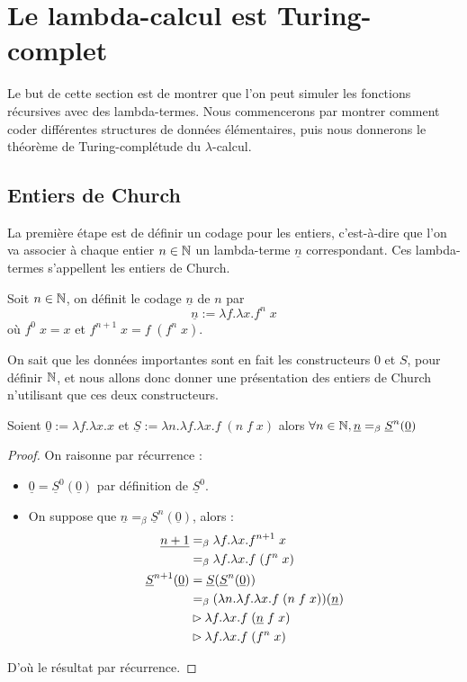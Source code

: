 \section{Le lambda-calcul est Turing-complet}

Le but de cette section est de montrer que l'on peut simuler les fonctions récursives avec des lambda-termes. Nous commencerons par montrer comment coder différentes structures de données élémentaires, puis nous donnerons le théorème de Turing-complétude du $\lambda$-calcul.

\subsection{Entiers de Church}

La première étape est de définir un codage pour les entiers, c'est-à-dire que l'on va associer à chaque entier $n\in\mathbb{N}$ un lambda-terme $\underline n$ correspondant. Ces lambda-termes s'appellent les entiers de Church.

\begin{defi}
    Soit $n\in\mathbb{N}$, on définit le codage $\underline n$ de $n$ par $$\underline n := \lambda f.\lambda x. f^n\;x$$ où $f^0\; x = x$ et $f^{n+1}\;x = f\;(f^n\;x)$.
\end{defi}

On sait que les données importantes sont en fait les constructeurs $0$ et $S$, pour définir $\mathbb{N}$, et nous allons donc donner une présentation des entiers de Church n'utilisant que ces deux constructeurs.

\begin{prop}
    Soient $\underline 0 := \lambda f.\lambda x.x$ et $\underline S := \lambda n.\lambda f.\lambda x.f\;(n\;f\;x)$ alors $\forall n\in\mathbb{N}, \underline n =_\beta \underline S^n(\underline 0)$
\end{prop}

\begin{proof}
    On raisonne par récurrence :
    \begin{itemize}[label=$\bullet$]
        \item $\underline 0 = \underline S^0 (\underline 0)$ par définition de $\underline S^0$.
        \item On suppose que $\underline n =_\beta \underline S^n(\underline 0)$, alors :
        \begin{align*}
            \underline{n+1} &=_\beta \lambda f.\lambda x.f^{n+1}\;x\\
            &=_\beta \lambda f.\lambda x.f\;(f^n\;x)\\
            \underline S^{n+1}(\underline 0) &= \underline S(\underline S^{n}(\underline 0))\\
            &=_\beta (\lambda n.\lambda f.\lambda x.f\;(n\;f\;x))(\underline n)\\
            &\rhd \lambda f.\lambda x.f\;(\underline n\;f\;x)\\
            &\rhd \lambda f.\lambda x.f\;(f^n\;x)
        \end{align*}
    \end{itemize}

    D'où le résultat par récurrence.
\end{proof}


